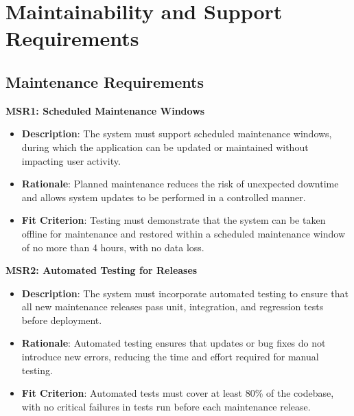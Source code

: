 \documentclass[12pt]{article}
\begin{document}
\section{Maintainability and Support Requirements}
\subsection{Maintenance Requirements}
\textbf{MSR1: Scheduled Maintenance Windows}
\begin{itemize}
    \item \textbf{Description}: The system must support scheduled maintenance
    windows, during which the application can be updated or maintained without
    impacting user activity.
    \item \textbf{Rationale}: Planned maintenance reduces the risk of unexpected
    downtime and allows system updates to be performed in a controlled manner.
    \item \textbf{Fit Criterion}: Testing must demonstrate that the system can
    be taken offline for maintenance and restored within a scheduled
    maintenance window of no more than 4 hours, with no data loss.
\end{itemize}
\textbf{MSR2: Automated Testing for Releases}
\begin{itemize}
    \item \textbf{Description}: The system must incorporate automated testing to
    ensure that all new maintenance releases pass unit, integration, and
    regression tests before deployment.
    \item \textbf{Rationale}: Automated testing ensures that updates or bug
    fixes do not introduce new errors, reducing the time and effort required for
    manual testing.
    \item \textbf{Fit Criterion}: Automated tests must cover at least 80\% of
    the codebase, with no critical failures in tests run before each maintenance
    release.
\end{itemize}
\end{document}
